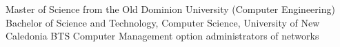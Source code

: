 %
%
%


\begin{scholarship}
					{
Master of Science from the Old Dominion University (Computer Engineering)}
					{Bachelor of Science and Technology, Computer Science, University of New Caledonia}
					{BTS Computer Management option administrators of networks}
\end{scholarship}